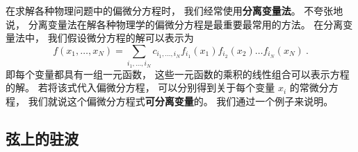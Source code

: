 
\begin{issues}
\issueDraft
\end{issues}

在求解各种物理问题中的偏微分方程时， 我们经常使用\textbf{分离变量法}。 不夸张地说， 分离变量法在解各种物理学的偏微分方程是最重要最常用的方法。 在分离变量法中， 我们假设微分方程的解可以表示为
\begin{equation}\label{eq_SepVar_2}
f(x_1, \dots , x_N) = \sum_{i_1, \dots, i_N} c_{i_1, \dots, i_N} f_{i_1}(x_1) f_{i_2}(x_2) \dots f_{i_N}(x_N)~.
\end{equation}
即每个变量都具有一组一元函数， 这些一元函数的乘积的线性组合可以表示方程的解。 若将该式代入偏微分方程， 可以分别得到关于每个变量 $x_i$ 的常微分方程， 我们就说这个偏微分方程式\textbf{可分离变量}的。 我们通过一个例子来说明。









\subsection{弦上的驻波}


